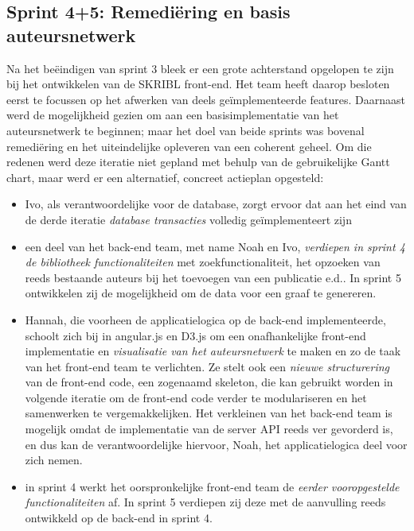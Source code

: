 \documentclass{article}
\begin{document}
\clearpage
\subsection{Sprint 4+5:  Remedi\"ering en basis auteursnetwerk}
Na het be\"eindigen van sprint 3 bleek er een grote achterstand opgelopen te zijn bij het ontwikkelen van de SKRIBL front-end. Het team heeft daarop besloten eerst te focussen op het afwerken van deels ge\"implementeerde features. Daarnaast werd de mogelijkheid gezien om aan een basisimplementatie van het auteursnetwerk te beginnen; maar het doel van beide sprints was bovenal remedi\"ering en het uiteindelijke opleveren van een coherent geheel. Om die redenen werd deze iteratie niet gepland met behulp van de gebruikelijke Gantt chart, maar werd er een alternatief, concreet actieplan opgesteld: 
\vspace{3 mm}
\begin{itemize}
	\item Ivo, als verantwoordelijke voor de database, zorgt ervoor dat aan het eind van de derde iteratie \textit{database transacties} volledig ge\"implementeert zijn
	\item een deel van het back-end team, met name Noah en Ivo, \textit{verdiepen in sprint 4 de bibliotheek functionaliteiten} met zoekfunctionaliteit, het opzoeken van reeds bestaande auteurs bij het toevoegen van een publicatie e.d.. In sprint 5 ontwikkelen 	zij de mogelijkheid om de data voor een graaf te genereren. 
	\item Hannah, die voorheen de applicatielogica op de back-end implementeerde, schoolt zich bij in angular.js en D3.js om een onafhankelijke front-end implementatie en \textit{visualisatie van het auteursnetwerk} te maken en zo de taak van het front-end team te verlichten. Ze stelt ook een \textit{nieuwe structurering} van de front-end code, een zogenaamd skeleton, die kan gebruikt worden in volgende iteratie om de front-end code verder te modulariseren en het samenwerken te vergemakkelijken.  Het verkleinen van het back-end team is mogelijk omdat de implementatie van de server API reeds ver gevorderd is, en dus kan de verantwoordelijke hiervoor, Noah, het applicatielogica deel voor zich nemen. 
	\item in sprint 4 werkt het oorspronkelijke front-end team de \textit{eerder vooropgestelde functionaliteiten} af. In sprint 5 verdiepen zij deze met de aanvulling reeds ontwikkeld op de back-end in sprint 4. 
\end{itemize}
\vspace{3 mm}
\end{document}
